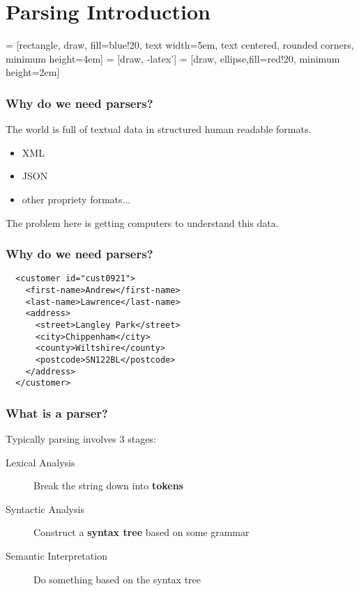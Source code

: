 \documentclass{beamer}
\begin{document}
\section{Parsing Introduction}




 = [rectangle, draw, fill=blue!20, 
    text width=5em, text centered, rounded corners, minimum height=4em]
 = [draw, -latex']
 = [draw, ellipse,fill=red!20,
    minimum height=2em]


\begin{frame}
\frametitle{Why do we need parsers?}
The world is full of textual data in structured human readable formats. \\
\begin{itemize}
\item XML
\item JSON
\item other propriety formats...
\end{itemize}
\bigskip
The problem here is getting computers to understand this data.
\end{frame}

\begin{frame}[fragile]
\frametitle{Why do we need parsers?}
\begin{verbatim}
  <customer id="cust0921">
    <first-name>Andrew</first-name>
    <last-name>Lawrence</last-name>
    <address>
      <street>Langley Park</street>
      <city>Chippenham</city>
      <county>Wiltshire</county>
      <postcode>SN122BL</postcode>
    </address>
  </customer>
\end{verbatim}


\end{frame}

\begin{frame}
\frametitle{What is a parser?}
Typically parsing involves 3 stages:
\medskip
\begin{description}
\item[Lexical Analysis] Break the string down into \textbf{tokens}

\item[Syntactic Analysis] Construct a \textbf{syntax tree} based on some grammar

\item[Semantic Interpretation] Do something based on the syntax tree
\end{description}

\end{frame}
    
\end{document}
